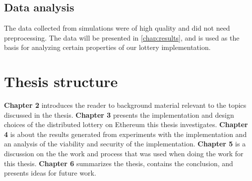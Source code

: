 \subsection{Data analysis}

The data collected from simulations were of high quality and did not need preprocessing. The data will be presented in \ref{chap:results}, and is used as the basis for analyzing certain properties of our lottery implementation. 

\section{Thesis structure}

\textbf{Chapter 2} introduces the reader to background material relevant to the topics discussed in the thesis. \newline
\textbf{Chapter 3} presents the implementation and design choices of the distributed lottery on Ethereum this thesis investigates.
\newline
\textbf{Chapter 4} is about the results generated from experiments with the implementation and an analysis of the viability and security of the implementation.
\newline
\textbf{Chapter 5} is a discussion on the the work and process that was used when doing the work for this thesis.
\newline
\textbf{Chapter 6} summarizes the thesis, contains the conclusion, and presents ideas for future work. 
